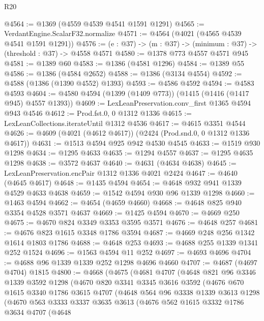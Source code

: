 \begin{lexlean}{R20}
\begin{coremodule}
@4564 := @1369 (@4559 @4539 @4541 @1591 @1291)
@4565 := VerdantEngine.ScalarF32.normalize
@4571 := @4564 (@4021 (@4565 @4539 @4541 @1591 @1291))
@4576 := (e : @37) -> (m : @37) -> (minimum : @37) -> (threshold : @37) -> @4558 @4571
@4580 := @1378 @773 @4557 @4571 @945
@4581 := @1389 @60
@4583 := @1386 (@4581 @1296)
@4584 := @1389 @55
@4586 := @1386 (@4584 @2652)
@4588 := @1386 (@3134 @4554)
@4592 := @4588 (@1386 (@1390 @4552) @1393)
@4593 := @4586 @4592
@4594 := @4583 @4593
@4604 := @4580 @4594 (@1399 (@1409 @773)) (@1415 (@1416 (@1417 @945) @4557 @1393))
@4609 := LexLeanPreservation.conv_first @1365 @4594 @943 @4546
@4612 := Prod.fst.{0, 0} @1312 @1336
@4615 := LexLeanCollections.iterateUntil @1312 @4536
@4617 := @4615 @3351 @4544
@4626 := @4609 (@4021 (@4612 @4617)) (@2424 (Prod.snd.{0, 0} @1312 @1336 @4617))
@4631 := @1513 @4594 @925 @942 @4530 @4545
@4633 := @1519 @930 @1298
@4634 := @1295 @4633
@4635 := @1294 @4557
@4637 := @1295 @4635 @1298
@4638 := @3572 @4637
@4640 := @4631 (@4634 @4638)
@4645 := LexLeanPreservation.encPair @1312 @1336 @4021 @2424
@4647 := @4640 (@4645 @4617)
@4648 := @1435 @4594
@4654 := @4648 @932 @941 @1339 @4529 @4633 @4638
@4659 := @1542 @4594 @930 @96 @1339 @1298
@4660 := @1463 @4594
@4662 := @4654 (@4659 @4660)
@4668 := @4648 @825 @940 @3354 @4528 @3571 @4637
@4669 := @1425 @4594
@4670 := @4669 @250
@4675 := @4670 @824 @3349 @3353 @3595 @3571
@4676 := @4648 @257
@4681 := @4676 @823 @1615 @3348 @1786 @3594
@4687 := @4669 @248 @256 @1342 @1614 @1803 @1786
@4688 := @4648 @253
@4693 := @4688 @255 @1339 @1341 @252 @1524
@4696 := @1563 @4594 @11 @252
@4697 := @4693 @4696
@4704 := @4688 @96 @1339 @1339 @252 @1298 @4696 @4660
@4707 := @4687 (@4697 @4704) @1815
@4800 := @4668
    (@4675
      (@4681
        @4707
        (@4648
          @821
          @96
          @3346
          @1339
          @3592
          @1298
          (@4670
            @820
            @3341
            @3345
            @3616
            @3592
            (@4676
              @670
              @1615
              @3340
              @1786
              @3615
              @4707
              (@4648
                @564
                @96
                @3338
                @1339
                @3613
                @1298
                (@4670
                  @563
                  @3333
                  @3337
                  @3635
                  @3613
                  (@4676
                    @562
                    @1615
                    @3332
                    @1786
                    @3634
                    @4707
                    (@4648

\end{coremodule}
\end{lexlean}
